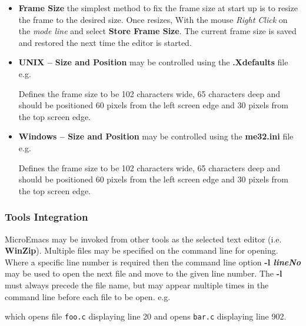 \documentclass[11pt,a4paper,pdftex]{article}
\begin{document}
\begin{itemize}
\begin{itemize}
      \item \textbf{Frame Size} the simplest method to fix the frame size at
      start up is to resize the frame to the desired size. Once resizes, With
      the mouse \textit{Right Click} on the \textit{mode line} and select
      \textbf{Store Frame Size}. The current frame size is saved and restored
      the next time the editor is started.

      \item \textbf{UNIX -- Size and Position} may be controlled using the
      \textbf{.Xdefaults} file e.g.


      Defines the frame size to be 102 characters wide, 65 characters deep and
      should be positioned 60 pixels from the left screen edge and 30 pixels
      from the top screen edge.

      \item \textbf{Windows -- Size and Position} may be controlled using the
      \textbf{me32.ini} file e.g.


      Defines the frame size to be 102 characters wide, 65 characters deep and
      should be positioned 60 pixels from the left screen edge and 30 pixels
      from the top screen edge.

    \end{itemize}

  \end{itemize}

\subsubsection{Tools Integration}

  MicroEmacs may be invoked from other tools as the selected text editor (i.e.
  \textbf{WinZip}). Multiple files may be specified on the command line for
  opening. Where a specific line number is required then the command line
  option \textbf{-l \textit{lineNo}} may be used to open the next file and
  move to the given line number. The \textbf{-l} must always precede the file
  name, but may appear multiple times in the command line before  each file
  to be open. e.g.


  which opens file \texttt{foo.c} displaying line 20 and opens \texttt{bar.c}
  displaying line 902.
\end{document}
